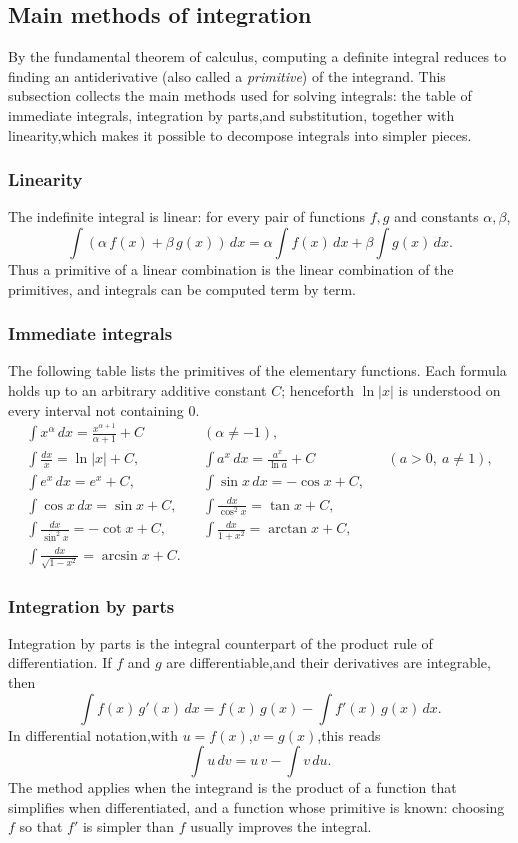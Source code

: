 \documentclass[11pt,a4paper]{article}
\theoremstyle{definition} \newtheorem{definition}{Definition} \theoremstyle{plain} \newtheorem{theorem}{Theorem}
\begin{document}
\subsection{Main methods of integration}
By the fundamental theorem of calculus, computing a definite integral reduces to finding an antiderivative (also called a \emph{primitive}) of the integrand.
This subsection collects the main methods used for solving integrals: the table of immediate integrals, integration by parts,and substitution, together with linearity,which makes it possible to decompose integrals into simpler pieces.
\subsubsection{Linearity}
The indefinite integral is linear: for every pair of functions $f,g$ and constants $\alpha,\beta$, \[ \int (\alpha\,f(x)+\beta\,g(x))\,dx
= \alpha\int f(x)\,dx + \beta\int g(x)\,dx.
\]
Thus a primitive of a linear combination is the linear combination of the primitives, and integrals can be computed term by term.
\subsubsection{Immediate integrals}
The following table lists the primitives of the elementary functions.
Each formula holds up to an arbitrary additive constant $C$; henceforth $\ln|x|$ is understood on every interval not containing $0$. \begin{align*} \int x^\alpha\,dx = \frac{x^{\alpha+1}}{\alpha+1}+C
&& (\alpha\neq -1), \\ \int \frac{dx}{x} = \ln|x|+C,
&& \int a^x\,dx = \frac{a^x}{\ln a}+C && (a>0,\ a\neq1),\\ \int e^x\,dx = e^x+C,
&& \int \sin x\,dx = -\cos x+C,\\ \int \cos x\,dx = \sin x+C,
&& \int \frac{dx}{\cos^2 x} = \tan x+C,\\ \int \frac{dx}{\sin^2 x} = -\cot x+C,
&& \int \frac{dx}{1+x^2} = \arctan x+C,\\ \int \frac{dx}{\sqrt{1-x^2}} = \arcsin x+C.
\end{align*}
\subsubsection{Integration by parts}
Integration by parts is the integral counterpart of the product rule of differentiation.
If $f$ and $g$ are differentiable,and their derivatives are integrable, then \[ \int f(x)\,g'(x)\,dx = f(x)\,g(x) - \int f'(x)\,g(x)\,dx. \]
In differential notation,with $u=f(x)$,$v=g(x)$,this reads \[ \int u\,dv = u\,v - \int v\,du. \]
The method applies when the integrand is the product of a function that simplifies when differentiated, and a function whose primitive is known: choosing $f$ so that $f'$ is simpler than $f$ usually improves the integral.
\end{document}
